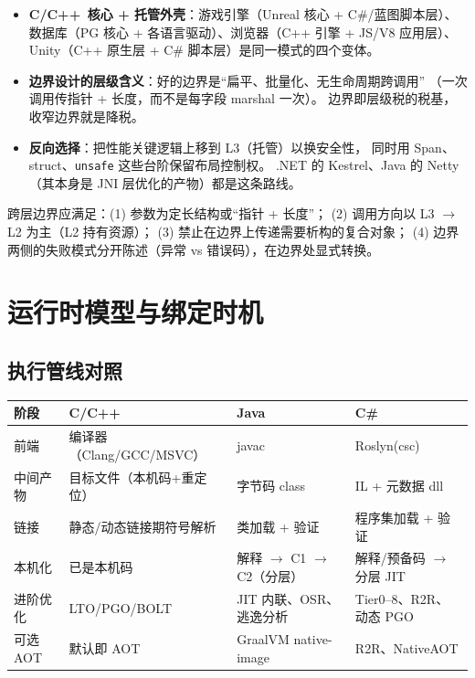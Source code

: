 \documentclass[12pt,a4paper,fontset=fandol]{ctexbook}
\newcommand{\Cplus}[1]{C++\,#1}
\begin{document}
\begin{itemize}
  \item \textbf{C/\allowbreak{}\Cplus{} 核心 + 托管外壳}：游戏引擎（Unreal 核心 + C\#/蓝图脚本层）、
        数据库（PG 核心 + 各语言驱动）、浏览器（C++ 引擎 + JS/V8 应用层）、
        Unity（C++ 原生层 + C\# 脚本层）是同一模式的四个变体。
  \item \textbf{边界设计的层级含义}：好的边界是``扁平、批量化、无生命周期跨调用''
        （一次调用传指针 + 长度，而不是每字段 marshal 一次）。
        边界即层级税的税基，收窄边界就是降税。
  \item \textbf{反向选择}：把性能关键逻辑上移到 L3（托管）以换安全性，
        同时用 Span、struct、\texttt{unsafe} 这些台阶保留布局控制权。
        .NET 的 Kestrel、Java 的 Netty（其本身是 JNI 层优化的产物）都是这条路线。
\end{itemize}

\begin{bestpractice}[title=边界规则]
跨层边界应满足：(1) 参数为定长结构或``指针 + 长度''；
(2) 调用方向以 L3 $\to$ L2 为主（L2 持有资源）；
(3) 禁止在边界上传递需要析构的复合对象；
(4) 边界两侧的失败模式分开陈述（异常 vs 错误码），在边界处显式转换。
\end{bestpractice}

\chapter{运行时模型与绑定时机}

\section{执行管线对照}

\begin{longtable}{@{}>{\raggedright\arraybackslash}p{}>{\raggedright\arraybackslash}p{}>{\raggedright\arraybackslash}p{}>{\raggedright\arraybackslash}p{}@{}}
\toprule
\textbf{阶段} & \textbf{C/\allowbreak{}\Cplus{}} & \textbf{Java} & \textbf{C\#} \\
\midrule
前端 & 编译器（Clang/\allowbreak{}\allowbreak{}GCC/\allowbreak{}\allowbreak{}MSVC） & javac & Roslyn(csc) \\
中间产物 & 目标文件（本机码+重定位） & 字节码 class & IL + 元数据 dll \\
链接 & 静态/动态链接期符号解析 & 类加载 + 验证 & 程序集加载 + 验证 \\
本机化 & 已是本机码 & 解释 $\to$ C1 $\to$ C2（分层） & 解释/预备码 $\to$ 分层 JIT \\
进阶优化 & LTO/PGO/BOLT & JIT 内联、OSR、逃逸分析 & Tier0--8、R2R、动态 PGO \\
可选 AOT & 默认即 AOT & GraalVM native-image & R2R、NativeAOT \\
\bottomrule
\end{longtable}
\end{document}
